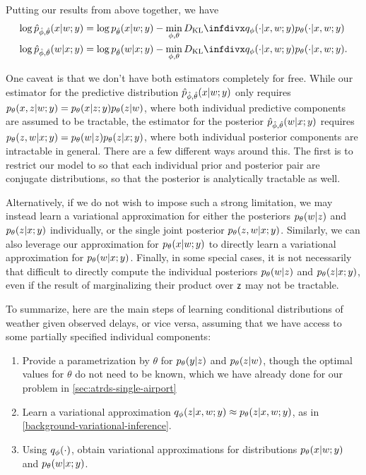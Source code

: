 \begin{proposition}
    Putting our results from above together, we have
    \begin{align}
    \log \pgdh{\hat\phi,\hat\theta}{x\given w;y}    
    &= \log\pgd{\hat\theta}{x\given w;y} - \min_{\phi,\theta} \DKL{\qgd{\phi}{\cdot\given x,w;y}}{\pgd{\theta}{\cdot\given x,w;y}}\\
    \log \pgdh{\hat\phi,\hat\theta}{w\given x;y} 
    &= \log\pgd{\hat\theta}{w\given x;y} - \min_{\phi,\theta} \DKL{\qgd{\phi}{\cdot\given x,w;y}}{\pgd{\theta}{\cdot\given x,w;y}}. 
\end{align}
\end{proposition}

One caveat is that we don't have both estimators completely for free. While our estimator for the predictive distribution $\pgdh{\hat\phi,\hat\theta}{x\given w;y}$ only requires $\pld{x,z\given w;y}=\pld{x\given z;y}\pld{z\given w}$, where both individual predictive components are assumed to be tractable, the estimator for the posterior $\pgdh{\hat\phi,\hat\theta}{w\given x;y}$ requires $\pld{z,w\given x;y}=\pld{w\given z}\pld{z\given x;y}$, where both individual posterior components are intractable in general. There are a few different ways around this. The first is to restrict our model to so that each individual prior and posterior pair are conjugate distributions, so that the posterior is analytically tractable as well.

Alternatively, if we do not wish to impose such a strong limitation, we may instead learn a variational approximation for either the posteriors $\pld{w\given z}$ and $\pld{z\given x;y}$ individually, or the single joint posterior $\pld{z,w\given x;y}$. Similarly, we can also leverage our approximation for $\pld{x\given w;y}$ to directly learn a variational approximation for $\pld{w\given x;y}$. Finally, in some special cases, it is not necessarily that difficult to directly compute the individual posteriors $\pld{w\given z}$ and $\pld{z\given x;y}$, even if the result of marginalizing their product over $\mathsf z$ may not be tractable.

To summarize, here are the main steps of learning conditional distributions of weather given observed delays, or vice versa, assuming that we have access to some partially specified individual components:

\begin{enumerate}
    \item Provide a parametrization by $\theta$ for $\pld{y\given z}$ and $\pld{z\given w}$, though the optimal values for $\theta$ do not need to be known, which we have already done for our problem in \cref{sec:atrds-single-airport}
    \item Learn a variational approximation $\qvd{z\given x,w;y}\approx\pld{z\given x,w;y}$, as in \cref{background-variational-inference}.
    \item Using $\qvd{\cdot}$, obtain variational approximations for distributions $\pld{x\given w;y}$ and $\pld{w\given x;y}$.
\end{enumerate}


